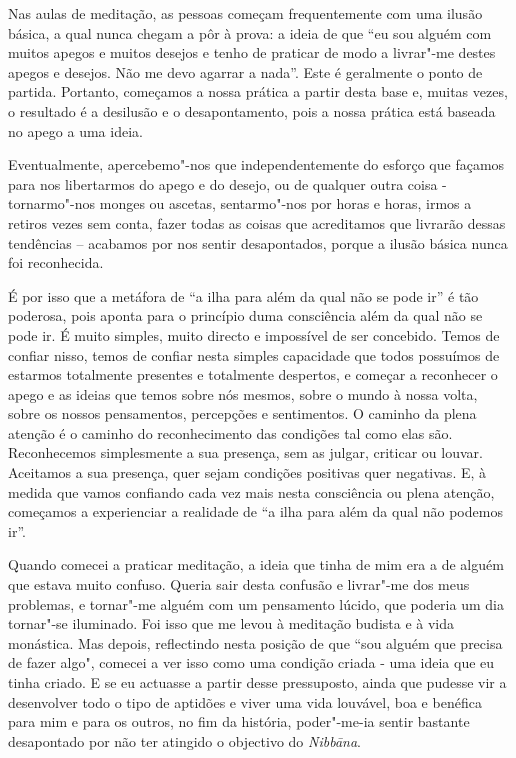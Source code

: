 Nas aulas de meditação, as pessoas começam frequentemente com uma ilusão
básica, a qual nunca chegam a pôr à prova: a ideia de que ``eu sou
alguém com muitos apegos e muitos desejos e tenho de praticar de modo a
livrar"-me destes apegos e desejos. Não me devo agarrar a nada''. Este é
geralmente o ponto de partida. Portanto, começamos a nossa prática a
partir desta base e, muitas vezes, o resultado é a desilusão e o
desapontamento, pois a nossa prática está baseada no apego a uma ideia.

Eventualmente, apercebemo"-nos que independentemente do esforço que
façamos para nos libertarmos do apego e do desejo, ou de qualquer outra
coisa - tornarmo"-nos monges ou ascetas, sentarmo"-nos por horas e horas,
irmos a retiros vezes sem conta, fazer todas as coisas que acreditamos
que livrarão dessas tendências -- acabamos por nos sentir desapontados,
porque a ilusão básica nunca foi reconhecida.

É por isso que a metáfora de ``a ilha para além da qual não se pode ir''
é tão poderosa, pois aponta para o princípio duma consciência além da
qual não se pode ir. É muito simples, muito directo e impossível de ser
concebido. Temos de confiar nisso, temos de confiar nesta simples
capacidade que todos possuímos de estarmos totalmente presentes e
totalmente despertos, e começar a reconhecer o apego e as ideias que
temos sobre nós mesmos, sobre o mundo à nossa volta, sobre os nossos
pensamentos, percepções e sentimentos. O caminho da plena atenção é o
caminho do reconhecimento das condições tal como elas são. Reconhecemos
simplesmente a sua presença, sem as julgar, criticar ou louvar.
Aceitamos a sua presença, quer sejam condições positivas quer negativas.
E, à medida que vamos confiando cada vez mais nesta consciência ou plena
atenção, começamos a experienciar a realidade de ``a ilha para além da
qual não podemos ir''.

Quando comecei a praticar meditação, a ideia que tinha de mim era a de
alguém que estava muito confuso. Queria sair desta confusão e livrar"-me
dos meus problemas, e tornar"-me alguém com um pensamento lúcido, que
poderia um dia tornar"-se iluminado. Foi isso que me levou à meditação
budista e à vida monástica. Mas depois, reflectindo nesta posição de que
“sou alguém que precisa de fazer algo", comecei a ver isso como uma
condição criada - uma ideia que eu tinha criado. E se eu actuasse a
partir desse pressuposto, ainda que pudesse vir a desenvolver todo o
tipo de aptidões e viver uma vida louvável, boa e benéfica para mim e
para os outros, no fim da história, poder"-me-ia sentir bastante
desapontado por não ter atingido o objectivo do \emph{Nibbāna}.

